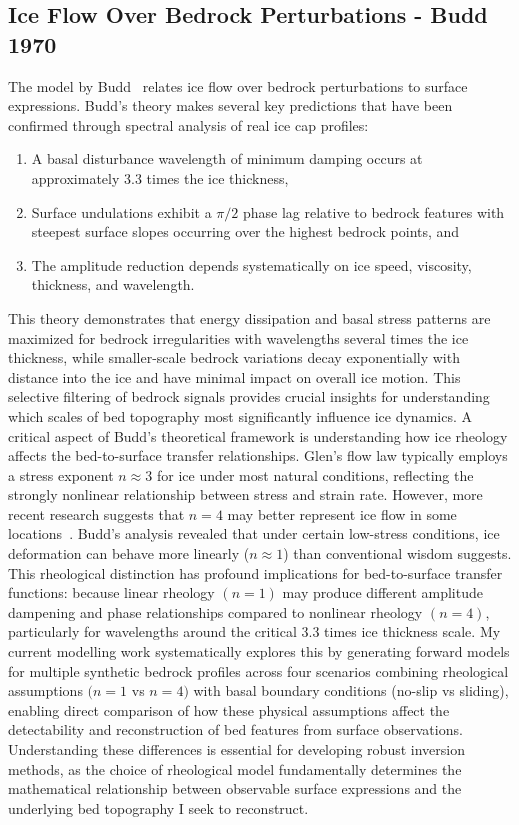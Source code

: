 \subsection{Ice Flow Over Bedrock Perturbations - Budd 1970}
The model by Budd~\cite{Budd_1970} relates ice flow over bedrock perturbations to surface expressions. Budd's theory makes several key predictions that have been confirmed through spectral analysis of real ice cap profiles: 
\begin{enumerate}
    \item A basal disturbance wavelength of minimum damping occurs at approximately 3.3 times the ice thickness, 
    \item Surface undulations exhibit a $\pi/2$ phase lag relative to bedrock features with steepest surface slopes occurring over the highest bedrock points, and 
    \item The amplitude reduction depends systematically on ice speed, viscosity, thickness, and wavelength. 
\end{enumerate}
This theory demonstrates that energy dissipation and basal stress patterns are maximized for bedrock irregularities with wavelengths several times the ice thickness, while smaller-scale bedrock variations decay exponentially with distance into the ice and have minimal impact on overall ice motion. This selective filtering of bedrock signals provides crucial insights for understanding which scales of bed topography most significantly influence ice dynamics.
A critical aspect of Budd's theoretical framework is understanding how ice rheology affects the bed-to-surface transfer relationships. Glen's flow law typically employs a stress exponent $n\approx 3$ for ice under most natural conditions, reflecting the strongly nonlinear relationship between stress and strain rate. However, more recent research suggests that $n = 4$ may better represent ice flow in some locations~\cite{Getraer_2025}.  Budd's analysis revealed that under certain low-stress conditions, ice deformation can behave more linearly ($n\approx 1$) than conventional wisdom suggests. 
This rheological distinction has profound implications for bed-to-surface transfer functions: because linear rheology $(n = 1)$ may produce different amplitude dampening and phase relationships compared to nonlinear rheology $(n = 4)$, particularly for wavelengths around the critical 3.3 times ice thickness scale.
My current modelling work systematically explores this by generating forward models for multiple synthetic bedrock profiles across four scenarios combining rheological assumptions $(n = 1$ vs $n = 4)$ with basal boundary conditions (no-slip vs sliding), enabling direct comparison of how these physical assumptions affect the detectability and reconstruction of bed features from surface observations. Understanding these differences is essential for developing robust inversion methods, as the choice of rheological model fundamentally determines the mathematical relationship between observable surface expressions and the underlying bed topography I seek to reconstruct.
